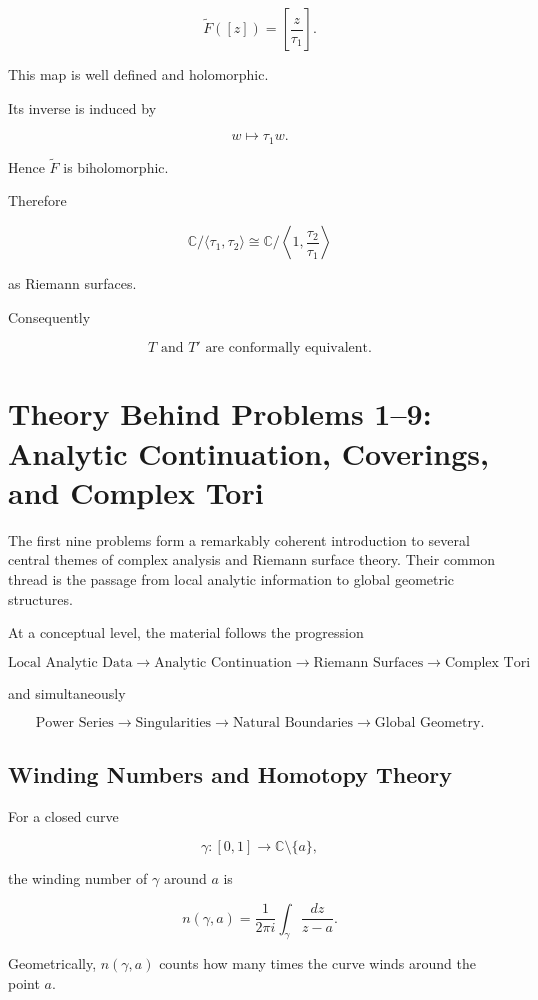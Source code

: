 \documentclass[12pt,a4paper]{article}
\theoremstyle{notespace}
\begin{document}
\[
\widetilde F([z])
=
\left[
\frac{z}{\tau_1}
\right].
\]

This map is well defined and holomorphic.

Its inverse is induced by

\[
w\mapsto\tau_1w.
\]

Hence \(\widetilde F\) is biholomorphic.

Therefore

\[
\boxed{
	\mathbb C/\langle\tau_1,\tau_2\rangle
	\cong
	\mathbb C/
	\left\langle
	1,
	\frac{\tau_2}{\tau_1}
	\right\rangle
}
\]

as Riemann surfaces.

Consequently

\[
\boxed{
	T
	\text{ and }
	T'
	\text{ are conformally equivalent.}
}
\]	
	
\section{Theory Behind Problems 1--9:
	Analytic Continuation, Coverings, and Complex Tori}

The first nine problems form a remarkably coherent introduction to several central themes of complex analysis and Riemann surface theory. Their common thread is the passage from local analytic information to global geometric structures.

At a conceptual level, the material follows the progression

\[
\boxed{
	\text{Local Analytic Data}
	\longrightarrow
	\text{Analytic Continuation}
	\longrightarrow
	\text{Riemann Surfaces}
	\longrightarrow
	\text{Complex Tori}
}
\]

and simultaneously

\[
\boxed{
	\text{Power Series}
	\longrightarrow
	\text{Singularities}
	\longrightarrow
	\text{Natural Boundaries}
	\longrightarrow
	\text{Global Geometry}.
}
\]

\subsection{ Winding Numbers and Homotopy Theory}

For a closed curve

\[
\gamma:[0,1]\to\mathbb C\setminus\{a\},
\]

the winding number of \(\gamma\) around \(a\) is

\[
n(\gamma,a)
=
\frac{1}{2\pi i}
\int_\gamma \frac{dz}{z-a}.
\]

Geometrically, \(n(\gamma,a)\) counts how many times the curve winds around the point \(a\).
\end{document}
